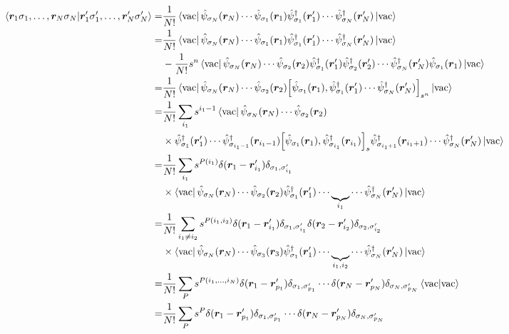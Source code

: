 \documentclass{ltjsarticle}
\begin{document}
\begin{align}
  \braket{\bm{r}_1\sigma_1,\dots,\bm{r}_N\sigma_N}{\bm{r}'_1\sigma'_1,\dots,\bm{r}'_{N}\sigma'_{N}}
  =&\frac{1}{N!} \bra{\rm{vac}}\hat{\psi}_{\sigma_N}(\bm{r}_N)\cdots\hat{\psi}_{\sigma_1}(\bm{r}_1)\hat{\psi}_{\sigma_1}^\dag (\bm{r}'_1)\cdots\hat{\psi}_{\sigma_N}^\dag (\bm{r}'_N)\ket{\rm{vac}}\\
  =&\frac{1}{N!}\bra{\rm{vac}}\hat{\psi}_{\sigma_N}(\bm{r}_N)\cdots\hat{\psi}_{\sigma_1}(\bm{r}_1)\hat{\psi}_{\sigma_1}^\dag (\bm{r}'_1)\cdots\hat{\psi}_{\sigma_N}^\dag (\bm{r}'_N)\ket{\rm{vac}}\\
  &-\frac{1}{N!}s^n\bra{\rm{vac}}\hat{\psi}_{\sigma_N}(\bm{r}_N)\cdots\hat{\psi}_{\sigma_2}(\bm{r}_2)\hat{\psi}_{\sigma_1}^\dag (\bm{r}'_1)\hat{\psi}_{\sigma_2}^\dag (\bm{r}'_2)\cdots\hat{\psi}_{\sigma_N}^\dag (\bm{r}'_N)\hat{\psi}_{\sigma_1}(\bm{r}_1)\ket{\rm{vac}}\\
  =&\frac{1}{N!}\bra{\rm{vac}}\hat{\psi}_{\sigma_N}(\bm{r}_N)\cdots\hat{\psi}_{\sigma_2}(\bm{r}_2)\comm{\hat{\psi}_{\sigma_1}(\bm{r}_1)}{\hat{\psi}_{\sigma_1}^\dag (\bm{r}'_1)\cdots\hat{\psi}_{\sigma_N}^\dag (\bm{r}'_N)}_{s^n}\ket{\rm{vac}}\\
  =&\frac{1}{N!}\sum_{i_1}s^{i_1-1}\bra{\rm{vac}}\hat{\psi}_{\sigma_N}(\bm{r}_N)\cdots\hat{\psi}_{\sigma_2}(\bm{r}_2)\\
  &\times\hat{\psi}_{\sigma_1}^\dag (\bm{r}'_1)\cdots\hat{\psi}_{\sigma_{i_1-1}}^\dag(\bm{r}_{i_1-1})\comm{\hat{\psi}_{\sigma_1}(\bm{r}_1)}{\hat{\psi}_{\sigma_{i_1}}^\dag(\bm{r}_{i_1})}_s\hat{\psi}_{\sigma_{i_1+1}}^\dag(\bm{r}_{i_1+1})\cdots\hat{\psi}_{\sigma_N}^\dag (\bm{r}'_N)\ket{\rm{vac}}\\
  =&\frac{1}{N!}\sum_{i_1}s^{P(i_1)}\delta(\bm{r}_1-\bm{r}'_{i_1})\delta_{\sigma_1,\sigma'_{i_1}}\\
  &\times\bra{\rm{vac}}\hat{\psi}_{\sigma_N}(\bm{r}_N)\cdots\hat{\psi}_{\sigma_2}(\bm{r}_2)\hat{\psi}_{\sigma_1}^\dag (\bm{r}'_1)\cdots\underbrace{}_{i_1}\cdots\hat{\psi}_{\sigma_N}^\dag (\bm{r}'_N)\ket{\rm{vac}}\\
  =&\frac{1}{N!}\sum_{i_1\neq i_2}s^{P(i_1,i_2)}\delta(\bm{r}_1-\bm{r}'_{i_1})\delta_{\sigma_1,\sigma'_{i_1}}\delta(\bm{r}_2-\bm{r}'_{i_2})\delta_{\sigma_2,\sigma'_{i_2}}\\
  &\times\bra{\rm{vac}}\hat{\psi}_{\sigma_N}(\bm{r}_N)\cdots\hat{\psi}_{\sigma_3}(\bm{r}_3)\hat{\psi}_{\sigma_1}^\dag (\bm{r}'_1)\cdots\underbrace{}_{i_1,i_2}\cdots\hat{\psi}_{\sigma_N}^\dag (\bm{r}'_N)\ket{\rm{vac}}\\
  =&\frac{1}{N!}\sum_P s^{P(i_1,\dots,i_N)}\delta(\bm{r}_1-\bm{r}'_{p_1})\delta_{\sigma_1,\sigma'_{p_1}}\cdots\delta(\bm{r}_N-\bm{r}'_{p_N})\delta_{\sigma_N,\sigma'_{p_N}}\braket{\rm{vac}}{\rm{vac}}\\
  =&\frac{1}{N!}\sum_P s^P\delta(\bm{r}_1-\bm{r}'_{p_1})\delta_{\sigma_1,\sigma'_{p_1}}\cdots\delta(\bm{r}_N-\bm{r}'_{p_N})\delta_{\sigma_N,\sigma'_{p_N}}
\end{align}
\end{document}
